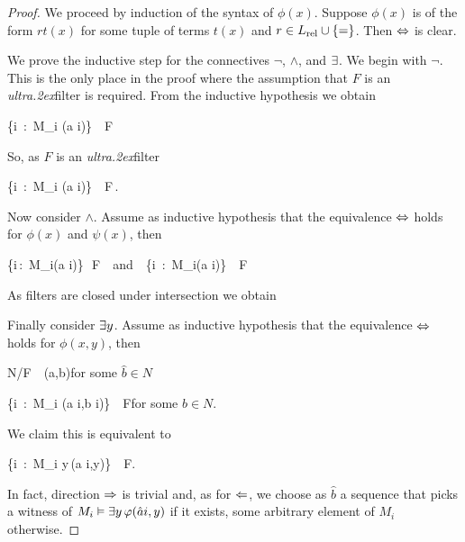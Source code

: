 \documentclass[creche.tex]{subfiles}
\begin{document}
\begin{proof}
We proceed by induction of the syntax of $\phi(x)$. Suppose $\phi(x)$ is of the form $rt(x)$ for some tuple of terms $t(x)$ and $r\in L_{\rm rel}\cup\{=\}$. Then $\Leftrightarrow$ is clear.

We prove the inductive step for the connectives $\neg$, $\wedge$, and $\exists$. We begin with $\neg$. This is the only place in the proof where the assumption that $F$ is an \textit{ultra\kern.2ex}filter is required. From the inductive hypothesis we obtain

%
{\IFF}%
{\big\{i\ :\ M_i\; \models\; \phi(\hat a i)\;\big\}\ \notin\ F}

So, as $F$ is an \textit{ultra\kern.2ex}filter

\ceq{}{\IFF}%
{\big\{i\ :\ M_i\; \models\; \neg\phi(\hat a i)\;\big\}\ \in\ F\,.}

Now consider $\wedge$. Assume as inductive hypothesis that the equivalence $\Leftrightarrow$ holds for $\phi(x)$ and $\psi(x)$, then

%
{\IFF}%
{\big\{i\,:\, M_i\models\phi(\hat a i)\big\}\,\in\, F\ \ {\rm and}\ \ \big\{i\, :\, M_i\models\psi(\hat a i)\big\}\, \in\, F}

As filters are closed under intersection we obtain


Finally consider $\exists y$.  Assume as inductive hypothesis that the equivalence $\Leftrightarrow$ holds for $\phi(x,y)$, then

%
{\IFF}%
{N/F\ \pmodels\  \phi\big(\hat a,\hat b\big)}\hfill for some $\hat b\in N$\phantom{.}

\ceq{}{\IFF}%
{\big\{i\ :\ M_i\; \models\; \phi(\hat a i,\hat b i)\;\big\}\ \in\ F}\hfill for some $\hat b\in N$.

We claim this is equivalent to

\ceq{}{\IFF}%
{\big\{i\ :\ M_i\; \models\; \E y\,\phi(\hat a i,y)\;\big\}\ \in\ F.}

In fact, direction $\Rightarrow$ is trivial and, as for $\Leftarrow$, we choose as $\hat b$ a sequence that picks a witness of $M_i\vDash\exists y\,\varphi(\hat a i,y)$ if it exists, some arbitrary element of $M_i$ otherwise.
\end{proof}
\end{document}
